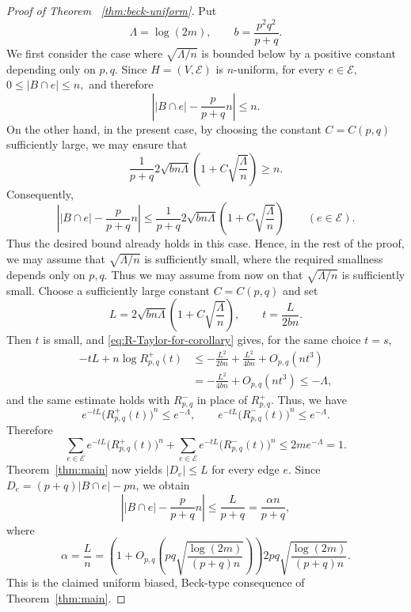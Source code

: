 \documentclass[twoside,12pt]{article}
\numberwithin{equation}{section}
\begin{document}
\begin{proof}[Proof of Theorem ~\ref{thm:beck-uniform}]
Put
\[
        \Lambda=\log(2m),
        \qquad
        b=\frac{p^2q^2}{p+q}.
\]
We first consider the case where \(\sqrt{\Lambda/n}\) is bounded below by a
positive constant depending only on \(p,q\).  Since \(H=(V,\mathcal E)\) is
\(n\)-uniform, 
 for every \(e\in\mathcal E\),
$0\le |B\cap e|\le n,$
and therefore
\[
        \left|
        |B\cap e|-\frac{p}{p+q}n
        \right|
        \le n.
\]
On the other hand, in the present case, by choosing the constant
\(C=C(p,q)\) sufficiently large, we may ensure that
\[
        \frac{1}{p+q}
        2\sqrt{bn\Lambda}
        \left(1+C\sqrt{\frac{\Lambda}{n}}\right)
        \ge n.
\]
Consequently,
\[
        \left|
        |B\cap e|-\frac{p}{p+q}n
        \right|
        \le
        \frac{1}{p+q}
        2\sqrt{bn\Lambda}
        \left(1+C\sqrt{\frac{\Lambda}{n}}\right)
        \qquad(e\in\mathcal E).
\]
Thus the desired bound already holds in this case.  Hence, in the rest of
the proof, we may assume that \(\sqrt{\Lambda/n}\) is sufficiently small,
where the required smallness depends only on \(p,q\).
Thus we may assume from now on that \(\sqrt{\Lambda/n}\) is sufficiently small.
Choose a sufficiently large
constant $C=C(p,q)$ and set
\[
        L=2\sqrt{bn\Lambda}
        \left(1+C\sqrt{\frac{\Lambda}{n}}\right),
        \qquad
        t=\frac{L}{2bn}.
\]
Then $t$ is small, and \eqref{eq:R-Taylor-for-corollary} gives, for the same
choice $t=s$,
\[
\begin{aligned}
        -tL+n\log R^+_{p,q}(t)
        &\le
        -\frac{L^2}{2bn}
        +\frac{L^2}{4bn}
        +O_{p,q}(nt^3)       \\
        &=
        -\frac{L^2}{4bn}+O_{p,q}(nt^3)
        \le -\Lambda,
\end{aligned}
\]
and the same estimate holds with $R^-_{p,q}$ in place of $R^+_{p,q}$. Thus, we have 
\[
        e^{-tL}\bigl(R^+_{p,q}(t)\bigr)^n\le e^{-\Lambda},
        \qquad
        e^{-tL}\bigl(R^-_{p,q}(t)\bigr)^n\le e^{-\Lambda}.
\]
Therefore
\[
        \sum_{e\in\mathcal E} e^{-tL}
        \bigl(R^+_{p,q}(t)\bigr)^n
        +
        \sum_{e\in\mathcal E} e^{-tL}
        \bigl(R^-_{p,q}(t)\bigr)^n
        \le
        2m e^{-\Lambda}=1.
\]
Theorem~\ref{thm:main} now yields
$|D_e|\le L$ for every edge $e$.  Since
$D_e=(p+q)|B\cap e|-pn$, we obtain
\[
        \left|
        |B\cap e|-\frac{p}{p+q}n
        \right|
        \le
        \frac{L}{p+q}
        =
        \frac{\alpha n}{p+q},
\]
where
\[
        \alpha=\frac{L}{n}
        =
        \left(
        1+O_{p,q}\!\left(
        pq\sqrt{\frac{\log(2m)}{(p+q)n}}
        \right)
        \right)
        2pq
        \sqrt{\frac{\log(2m)}{(p+q)n}}.
\]
This is the claimed uniform biased, Beck-type consequence of
Theorem~\ref{thm:main}.
\end{proof}
\end{document}
